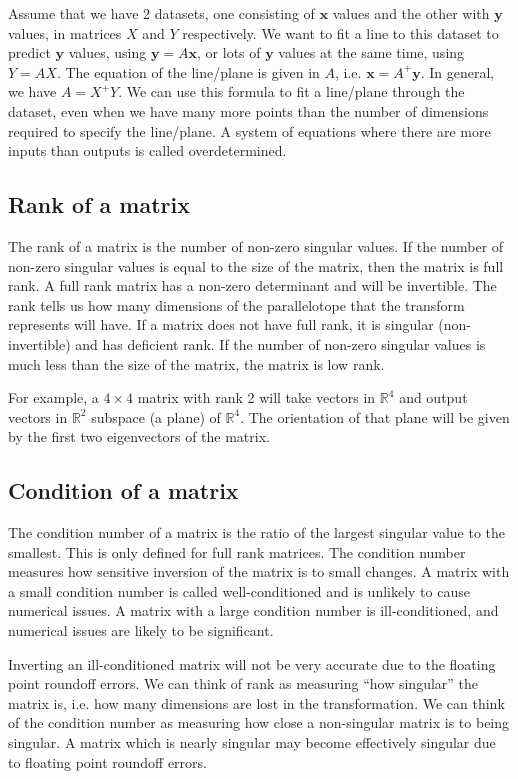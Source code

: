 \documentclass[a4paper, openany]{memoir}
\begin{document}
    Assume that we have 2 datasets, one consisting of $\mathbf{x}$ values and the other with $\mathbf{y}$ values, in matrices $X$ and $Y$ respectively. We want to fit a line to this dataset to predict $\mathbf{y}$ values, using $\mathbf{y} = A \mathbf{x}$, or lots of $\mathbf{y}$ values at the same time, using $Y = AX$. The equation of the line/plane is given in $A$, i.e. $\mathbf{x} = A^+ \mathbf{y}$. In general, we have $A = X^+ Y$. We can use this formula to fit a line/plane through the dataset, even when we have many more points than the number of dimensions required to specify the line/plane. A system of equations where there are more inputs than outputs is called overdetermined.

    \subsection{Rank of a matrix}
    The rank of a matrix is the number of non-zero singular values. If the number of non-zero singular values is equal to the size of the matrix, then the matrix is full rank. A full rank matrix has a non-zero determinant and will be invertible. The rank tells us how many dimensions of the parallelotope that the transform represents will have. If a matrix does not have full rank, it is singular (non-invertible) and has deficient rank. If the number of non-zero singular values is much less than the size of the matrix, the matrix is low rank.

    For example, a $4 \times 4$ matrix with rank 2 will take vectors in $\mathbb{R}^4$ and output vectors in $\mathbb{R}^2$ subspace (a plane) of $\mathbb{R}^4$. The orientation of that plane will be given by the first two eigenvectors of the matrix.

    \subsection{Condition of a matrix}
    The condition number of a matrix is the ratio of the largest singular value to the smallest. This is only defined for full rank matrices. The condition number measures how sensitive inversion of the matrix is to small changes. A matrix with a small condition number is called well-conditioned and is unlikely to cause numerical issues. A matrix with a large condition number is ill-conditioned, and numerical issues are likely to be significant.

    Inverting an ill-conditioned matrix will not be very accurate due to the floating point roundoff errors. We can think of rank as measuring ``how singular'' the matrix is, i.e. how many dimensions are lost in the transformation. We can think of the condition number as measuring how close a non-singular matrix is to being singular. A matrix which is nearly singular may become effectively singular due to floating point roundoff errors.
    \newpage
\end{document}
